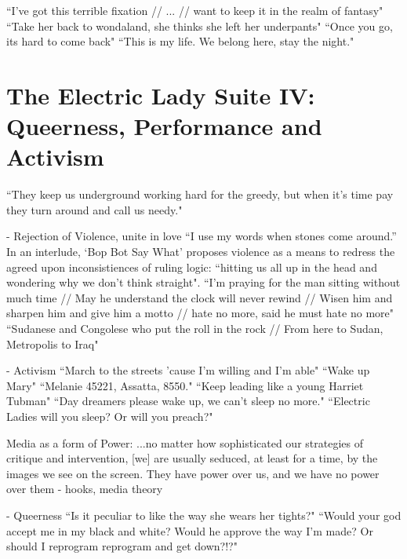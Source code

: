 \documentclass[a4paper, 11pt]{article} %
\begin{document}
``I've got this terrible fixation // ... // want to keep it in the realm of fantasy"\cite{makethebus}
``Take her back to wondaland, she thinks she left her underpants"\cite{wondaland}
``Once you go, its hard to come back"\cite{wondaland}
``This is my life. We belong here, stay the night."\cite{wondaland}


\section*{The Electric Lady Suite IV: Queerness, Performance and Activism}

``They keep us underground working hard for the greedy, but when it's time pay they turn around and call us needy."\cite{queen}

- Rejection of Violence, unite in love
``I use my words when stones come around.''\cite{manymoons}
In an interlude, `Bop Bot Say What' proposes violence as a means to redress the agreed upon inconsistiences of ruling logic: ``hitting us all up in the head and wondering why we don't think straight"\cite{chromeshoppe}.
``I'm praying for the man sitting without much time // May he understand the clock will never rewind // Wisen him and sharpen him and give him a motto // hate no more, said he must hate no more"\cite{danceordie}
``Sudanese and Congolese who put the roll in the rock // From here to Sudan, Metropolis to Iraq"\cite{danceordie}

- Activism
``March to the streets 'cause I'm willing and I'm able"\cite{queen}
``Wake up Mary"\cite{sallyride}
``Melanie 45221, Assatta, 8550."\cite{chromeshoppe}
``Keep leading like a young Harriet Tubman"\cite{queen}
``Day dreamers please wake up, we can't sleep no more."\cite{sincerelyjane}
``Electric Ladies will you sleep? Or will you preach?"\cite{queen}

Media as a form of Power:
...no matter how sophisticated our strategies of critique and intervention, [we] are usually seduced, at least for a time, by the images we see on the screen. They have power over us, and we have no power over them - hooks, media theory

- Queerness
``Is it peculiar to like the way she wears her tights?"\cite{queen}
``Would your god accept me in my black and white? Would he approve the way I'm made? Or should I reprogram reprogram and get down?!?"\cite{queen}

\end{document}
